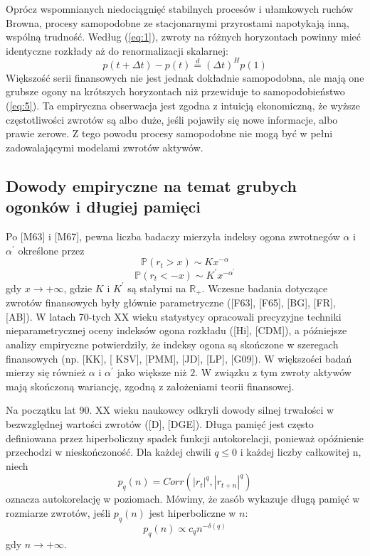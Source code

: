 \documentclass[12pt]{article}
\theoremstyle{definition}
\begin{document}
Oprócz wspomnianych niedociągnięć stabilnych procesów i ułamkowych ruchów Browna, procesy samopodobne ze stacjonarnymi przyrostami napotykają inną, wspólną trudność. Według (\ref{eq:1}), zwroty na różnych horyzontach powinny mieć identyczne rozkłady aż do renormalizacji skalarnej:
\begin{equation}
\label{eq:5}
p(t+\Delta t)-p(t) \stackrel{d}{=} (\Delta t)^H p(1)
\end{equation}
Większość serii finansowych nie jest jednak dokładnie samopodobna, ale mają one grubsze ogony na krótszych horyzontach niż przewiduje to samopodobieństwo (\ref{eq:5}). Ta empiryczna obserwacja jest zgodna z intuicją ekonomiczną, że wyższe częstotliwości zwrotów są albo duże, jeśli pojawiły się nowe informacje, albo prawie zerowe. Z tego powodu procesy samopodobne nie mogą być w pełni zadowalającymi modelami zwrotów aktywów.

\subsection{Dowody empiryczne na temat grubych ogonków i długiej pamięci}

Po [M63] i [M67], pewna liczba badaczy mierzyła indeksy ogona zwrotnegów $\alpha$ i $\alpha^\prime$ określone przez
$$\mathbb{P}(r_t>x)\sim Kx^{-\alpha}$$
$$\mathbb{P}(r_t<-x)\sim K^{\prime}x^{-\alpha^{\prime}}$$
gdy $x \to +\infty$, gdzie $K$ i $K^{\prime}$ są stałymi na $\mathbb{R}_{+}$. Wczesne badania dotyczące zwrotów finansowych były głównie parametryczne ([F63], [F65], [BG], [FR], [AB]). W latach 70-tych XX wieku statystycy opracowali precyzyjne techniki nieparametrycznej oceny indeksów ogona rozkładu ([Hi], [CDM]), a późniejsze analizy empiryczne potwierdziły, że indeksy ogona są skończone w szeregach finansowych (np. [KK], [ KSV], [PMM], [JD], [LP], [G09]). W większości badań mierzy się również $\alpha$ i $\alpha^{\prime}$ jako większe niż $2$. W związku z tym zwroty aktywów mają skończoną wariancję, zgodną z założeniami teorii finansowej.

Na początku lat 90. XX wieku naukowcy odkryli dowody silnej trwałości w bezwzględnej wartości zwrotów ([D], [DGE]). Długa pamięć jest często definiowana przez hiperboliczny spadek funkcji autokorelacji, ponieważ opóźnienie przechodzi w nieskończoność. Dla każdej chwili $q \leq 0$ i każdej liczby całkowitej n, niech
\begin{equation}
\label{eq:6}
p_q(n) = Corr(|r_t|^q, |r_{t+n}|^q)
\end{equation}
oznacza autokorelację w poziomach. Mówimy, że zasób wykazuje długą pamięć
w rozmiarze zwrotów, jeśli $p_q (n)$ jest hiperboliczne w $n$:
\begin{equation}
\label{eq:7}
p_q(n) \propto c_q n^{-\delta(q)}
\end{equation}
gdy $n \to +\infty$.
\end{document}
